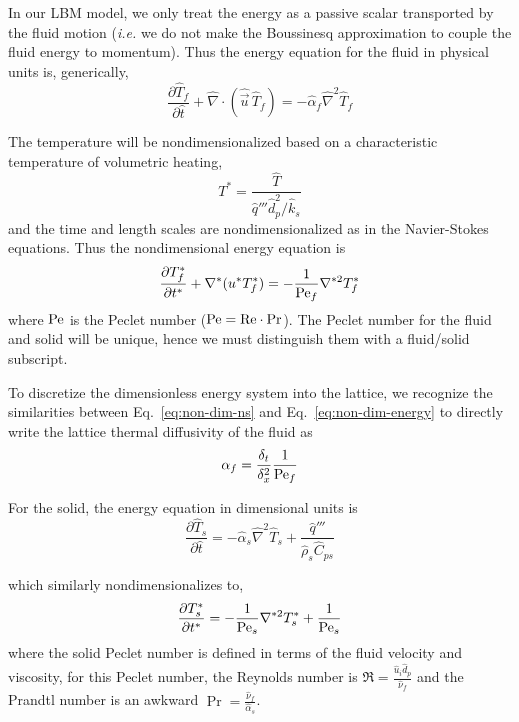 In our LBM model, we only treat the energy as a passive scalar transported by the fluid motion (\textit{i.e.} we do not make the Boussinesq approximation to couple the fluid energy to momentum). Thus the energy equation for the fluid in physical units is, generically,
\begin{equation}
	\frac{\partial \hat{T}_f}{\partial \hat{t}} + \hat{\nabla}\cdot(\hat{\vec{u}}\,\hat{T}_f) = -\hat{\alpha}_f\hat{\nabla}^2\hat{T}_f
\end{equation}

The temperature will be nondimensionalized based on a characteristic temperature of volumetric heating,
\begin{equation}
	T^* = \frac{\hat{T}}{\hat{q}''' \hat{d}_p^2/\hat{k}_s}
\end{equation}
and the time and length scales are nondimensionalized as in the Navier-Stokes equations. Thus the nondimensional energy equation is
\begin{equation}\label{eq:non-dim-energy}
	\frac{\partial T^*_f}{\partial t^*} + \nabla^*(u^*T^*_f) = -\frac{1}{\mathrm{Pe}_f} \nabla^{*2}T^*_f
\end{equation}
where $\mathrm{Pe}$ is the Peclet number ($\mathrm{Pe} = \mathrm{Re}\cdot \mathrm{Pr}$). The Peclet number for the fluid and solid will be unique, hence we must distinguish them with a fluid/solid subscript.

To discretize the dimensionless energy system into the lattice, we recognize the similarities between Eq.~\ref{eq:non-dim-ns} and Eq.~\ref{eq:non-dim-energy} to directly write the lattice thermal diffusivity of the fluid as
\begin{equation}
	\alpha_f = \frac{\delta_t}{\delta_x^2}\frac{1}{\mathrm{Pe}_f}
\end{equation}

For the solid, the energy equation in dimensional units is
\begin{equation}
	\frac{\partial \hat{T}_s}{\partial \hat{t}} = -\hat{\alpha}_s\hat{\nabla}^2\hat{T}_s + \frac{\hat{q}'''}{\hat{\rho}_s\hat{C}_{ps}}
\end{equation}

which similarly nondimensionalizes to,
\begin{equation}\label{eq:non-dim-energy-solid}
	\frac{\partial T^*_s}{\partial t^*} = -\frac{1}{\mathrm{Pe}_s} \nabla^{*2}T^*_s + \frac{1}{\mathrm{Pe}_s}
\end{equation}
where the solid Peclet number is defined in terms of the fluid velocity and viscosity, for this Peclet number, the Reynolds number is $\Re = \frac{\hat{u}_i \hat{d}_p}{\hat{\nu}_f}$ and the Prandtl number is an awkward $\Pr = \frac{\hat{\nu}_f}{\hat{\alpha}_s}$. 

